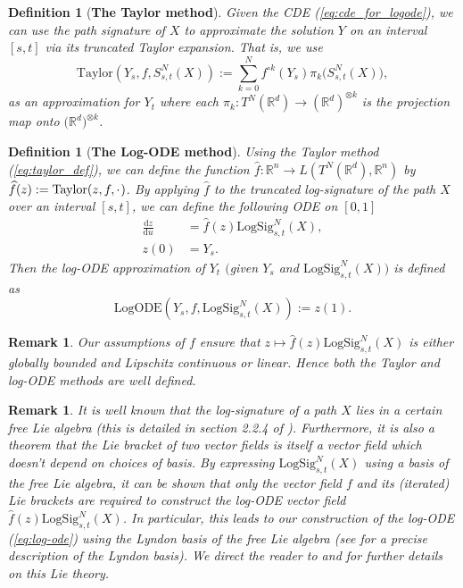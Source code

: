 \documentclass{article}
\newcommand{\R}{\mathbb{R}}
\newcommand{\m}{\hspace{0.25mm}}
\newtheorem{definition}[theorem]{Definition}
\newtheorem{remark}[theorem]{Remark}
\newcommand{\logsig}{\mathrm{LogSig}}
\newcommand{\dby}{\mathrm{d}}
\begin{document}
\begin{definition}[\textbf{The Taylor method}] Given the CDE (\ref{eq:cde_for_logode}), we can use the path signature of $X$ to approximate the solution $Y$ on an interval $[s,t]$ via its truncated Taylor expansion. That is, we use
\begin{equation}
\mathrm{Taylor}(Y_s, f, S_{s,t}^N(X)) := \sum_{k=0}^N f^{\circ k}(Y_s)\pi_k \big(S_{s,t}^N(X)\big),
\label{eq:taylor_def}
\end{equation}
as an approximation for $Y_t$ where each $\pi_k : T^N(\R^d)\rightarrow (\R^d)^{\otimes k}$ is the projection map onto $\big(\R^d\big)^{\otimes k}$.
\end{definition}\medbreak

\begin{definition}[\textbf{The Log-ODE method}]\label{def:logode} Using the Taylor method (\ref{eq:taylor_def}), we can define the function $\widehat{f} : \R^n \rightarrow L(T^N(\R^d), \R^n)$ by $\widehat{f}(z) := \mathrm{Taylor}(z, f, \cdot\m)$. By applying $\widehat{f}$ to the truncated log-signature of the path $X$ over an interval $[s,t]$, we can define the following ODE on $[0,1]$
\begin{align}
\frac{\dby z}{\dby u} & = \widehat{f}(z)\logsig_{s,t}^N(X),\label{eq:first_logode_def}\\[3pt]
z(0) & = Y_s.\nonumber
\end{align}
Then the log-ODE approximation of $Y_t$ $($given $Y_s$ and $\logsig_{s,t}^N(X))$ is defined as
\begin{equation}
\mathrm{LogODE}(Y_s, f, \logsig_{s,t}^N(X)) := z(1).
\label{eq:second_logode_def}
\end{equation}
\end{definition}
\begin{remark}
Our assumptions of $f$ ensure that $z\mapsto\widehat{f}(z)\logsig_{s,t}^N(X)$ is either globally bounded and Lipschitz continuous or linear. Hence both the Taylor and log-ODE methods are well defined.
\end{remark}
\begin{remark}
It is well known that the log-signature of a path $X$ lies in a certain free Lie algebra (this is detailed in section 2.2.4 of \citet{roughpath2007notes}). Furthermore, it is also a theorem that the Lie bracket of two vector fields is itself a vector field which doesn't depend on choices of basis.
By expressing $\logsig_{s,t}^N(X)$ using a basis of the free Lie algebra, it can be shown that only the vector field $f$ and its (iterated) Lie brackets are required to construct the log-ODE vector field $\widehat{f}(z)\logsig_{s,t}^N(X)$. In particular, this leads to our construction of the log-ODE (\ref{eq:log-ode}) using the Lyndon basis of the free Lie algebra (see \cite{reizenstein2017logsig} for a precise description of the Lyndon basis). We direct the reader to \citet{lyons2014streams} and \citet{logode2014estimate} for further details on this Lie theory.
\end{remark}
\end{document}
